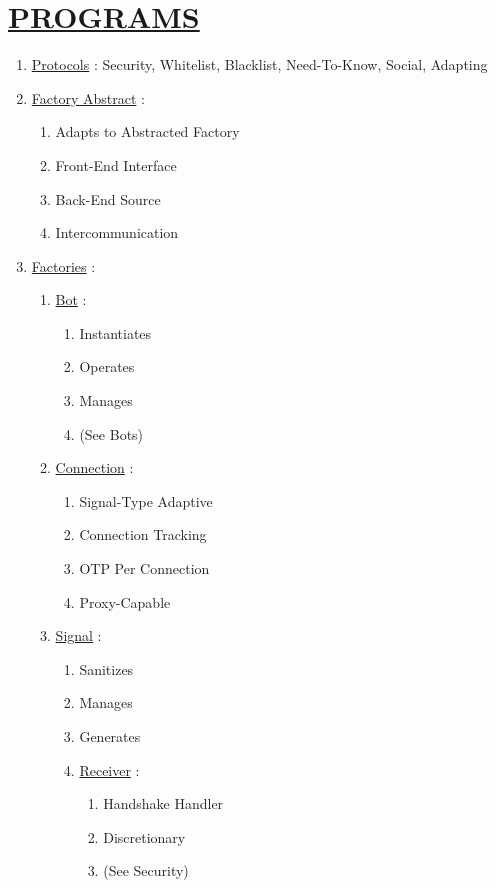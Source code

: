 \documentclass[11pt]{article}
\begin{document}
\section*{\ul{PROGRAMS}}
\begin{enumerate}
	\item[] \ul{Protocols} : Security, Whitelist, Blacklist, Need-To-Know, Social, Adapting
	
	\item[] \ul{Factory Abstract} :
	\begin{enumerate}
		\item[] Adapts to Abstracted Factory
		\item[] Front-End Interface
		\item[] Back-End Source
		\item[] Intercommunication
	\end{enumerate}
	
	\item[] \ul{Factories} :
	\begin{enumerate}
		\item[] \ul{Bot} :
		\begin{enumerate}
			\item[] Instantiates
			\item[] Operates
			\item[] Manages
			\item[] (See Bots)
		\end{enumerate}
		
		\item[] \ul{Connection} :
		\begin{enumerate}
			\item[] Signal-Type Adaptive
			\item[] Connection Tracking
			\item[] OTP Per Connection
			\item[] Proxy-Capable
		\end{enumerate}
		
		\item[] \ul{Signal} :
		\begin{enumerate}
			\item[] Sanitizes
			\item[] Manages
			\item[] Generates
			
			\item[] \ul{Receiver}  :
			\begin{enumerate}
				\item[] Handshake Handler
				\item[] Discretionary
				\item[] (See Security)
			\end{enumerate}
			

\end{enumerate}
\end{enumerate}
\end{enumerate}
\end{document}
